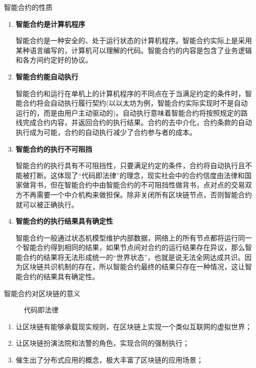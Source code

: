 \documentclass[11pt]{beamer}
\begin{document}
\begin{frame}{智能合约的性质}

	\begin{enumerate}
		\item \textbf{智能合约是计算机程序}

		      {\tiny 智能合约是一种安全的、处于运行状态的计算机程序。智能合约实际上是采用某种语言编写的，计算机可以理解的代码。智能合约的内容是包含了业务逻辑和各方间约定好的协议。}

		\item \textbf{智能合约能自动执行}

		      {\tiny  智能合约和运行在单机上的计算机程序的不同点在于当满足约定的条件时，智能合约将会自动执行履行契约(以以太坊为例，智能合约实际实现时不是自动运行的，而是由用户主动驱动的)。自动执行意味着智能合约将按照规定的路线完成合约内容，并返回合约的执行结果。合约的去中介化，合约条款的自动执行成为可能，合约的自动执行减少了合约参与者的成本。}

		\item \textbf{智能合约的执行不可阻挡}

		      {\tiny  智能合约的执行具有不可阻挡性，只要满足约定的条件，合约将自动执行且不能被打断。这体现了“代码即法律”的理念，现实社会中的合约信度由法律和国家做背书，但在智能合约中由智能合约的不可阻挡性做背书，点对点的交易双方不再需要一个中介机构来做担保。除非关闭所有区块链节点，否则智能合约就可以被正确执行。}

		\item \textbf{智能合约的执行结果具有确定性}

		      {\tiny  智能合约一般通过状态机模型维护内部数据，网络上的所有节点都将运行同一个智能合约得到相同的结果，如果节点间对合约的运行结果存在异议，那么智能合约的结果将无法形成统一的“世界状态”，也就是说无法全网达成共识。因为区块链共识机制的存在，所以智能合约最终的结果只存在一种情况，这让智能合约的结果具有确定性。}
	\end{enumerate}
\end{frame}

\begin{frame}{智能合约对区块链的意义}
	\begin{figure}
		\centering
		\huge
		代码即法律
	\end{figure}
	\begin{enumerate}
		\item 让区块链有能够承载现实规则，在区块链上实现一个类似互联网的虚拟世界；
		\item 让区块链扮演法院和法警的角色，实现合同的强制执行；
		\item 催生出了分布式应用的概念，极大丰富了区块链的应用场景；
	\end{enumerate}
\end{frame}
\end{document}
